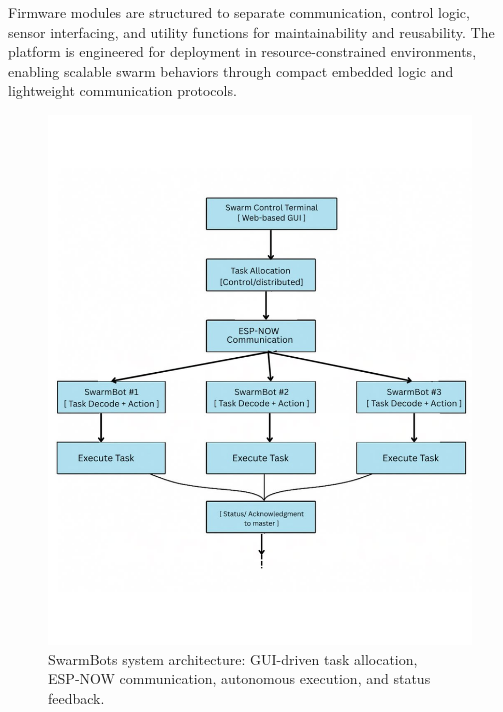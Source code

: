 \documentclass[conference]{IEEEtran}
\begin{document}
\begin{enumerate}
Firmware modules are structured to separate communication, control logic, sensor interfacing, and utility functions for maintainability and reusability. The platform is engineered for deployment in resource-constrained environments, enabling scalable swarm behaviors through compact embedded logic and lightweight communication protocols.

\begin{figure}[t]
    \centering
    \includegraphics[width=\columnwidth]{figs/Swarm Block.png}
\caption{SwarmBots system architecture: GUI-driven task allocation, ESP‑NOW communication, autonomous execution, and status feedback.}


  \label{fig:system-architecture}
\end{figure}
\end{enumerate}
\end{document}
